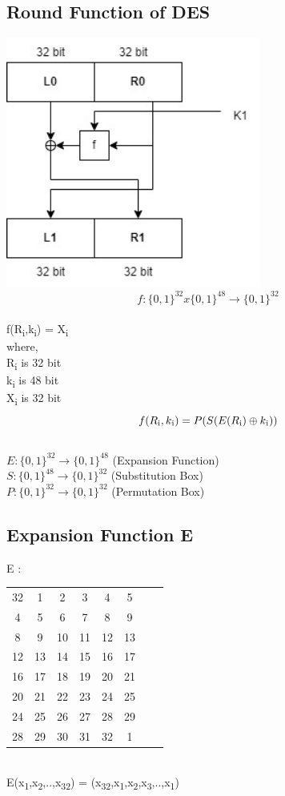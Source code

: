 \documentclass[11pt]{article}
\begin{document}
	\subsection{Round Function of DES}
	\centering\includegraphics[width = 8.4cm]{Round Function of DES.jpg}
	\flushleft$$f : \{0,1\}^{32} x \{0,1\}^{48} \rightarrow \{0,1\}^{32}$$\\
	f(R\textsubscript{i},k\textsubscript{i}) = X\textsubscript{i}\\
	where,\\
	R\textsubscript{i} is 32 bit\\
	k\textsubscript{i} is 48 bit\\
	X\textsubscript{i} is 32 bit\\
	$$f(R\textsubscript{i},k\textsubscript{i}) = P(S(E(R\textsubscript{i}) \oplus k\textsubscript{i}))$$\\
	$E : \{0,1\}^{32} \rightarrow \{0,1\}^{48}$ (Expansion Function)\\
	$S : \{0,1\}^{48} \rightarrow \{0,1\}^{32}$ (Substitution Box)\\
	$P : \{0,1\}^{32} \rightarrow \{0,1\}^{32}$ (Permutation Box)\\
	\subsection{Expansion Function E}
	E :
	\begin{tabular}{ c c c c c c c c }
		32 & 1 & 2 & 3 & 4 & 5 \\ 
		4 & 5 & 6 & 7 & 8 & 9 \\  
		8 & 9 & 10 & 11 & 12 & 13 \\
		12 & 13 & 14 & 15 & 16 & 17 \\
		16 & 17 & 18 & 19 & 20 & 21 \\
		20 & 21 & 22 & 23 & 24 & 25 \\
		24 & 25 & 26 & 27 & 28 & 29 \\
		28 & 29 & 30 & 31 & 32 & 1 
	\end{tabular}\\
	E(x\textsubscript{1},x\textsubscript{2},..,x\textsubscript{32}) = (x\textsubscript{32},x\textsubscript{1},x\textsubscript{2},x\textsubscript{3},..,x\textsubscript{1})\\
\end{document}
